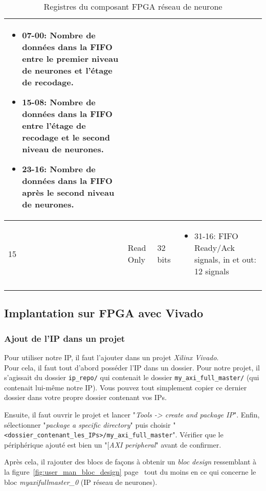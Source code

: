 \begin{longtable}{| p{} | p{} | p{} | p{} |}
\begin{itemize}
		\item 07-00: Nombre de données dans la FIFO entre le premier niveau de neurones et l'étage de recodage.
		\item 15-08: Nombre de données dans la FIFO entre l'étage de recodage et le second niveau de neurones.
		\item 23-16: Nombre de données dans la FIFO après le second niveau de neurones.
	\end{itemize}\\ \hline
	15 & Read Only & 32 bits &
	\begin{itemize}
		\item 31-16: FIFO Ready/Ack signals, in et out: 12 signals
	\end{itemize}\\ \hline
\caption{Registres du composant FPGA réseau de neurone}
\label{fig:user_manual_registers}
\end{longtable}

\subsection{Implantation sur FPGA avec Vivado}

\subsubsection{Ajout de l'IP dans un projet}
Pour utiliser notre IP, il faut l'ajouter dans un projet {\em Xilinx Vivado}.\\

Pour cela, il faut tout d'abord posséder l'IP dans un dossier. Pour notre projet,
il s'agissait du dossier \verb+ip_repo/+ qui contenait le dossier \verb+my_axi_full_master/+
(qui contenait lui-même notre IP). Vous pouvez tout simplement copier ce dernier dossier dans votre propre
dossier contenant vos IPs.

Ensuite, il faut ouvrir le projet et lancer "{\em Tools -> create and package IP}".
Enfin, sélectionner "{\em package a specific directory}" puis choisir "\verb+<dossier_contenant_les_IPs>/my_axi_full_master+".
Vérifier que le périphérique ajouté est bien un "[{\em AXI peripheral}" avant de confirmer.

Après cela, il rajouter des blocs de façons à obtenir un {\em bloc design} ressemblant à la figure~\ref{fig:user_man_bloc_design} page~\pageref{fig:user_man_bloc_design}
tout du moins en ce qui concerne le bloc {\em myaxifullmaster\_0} (IP réseau de neurones).

